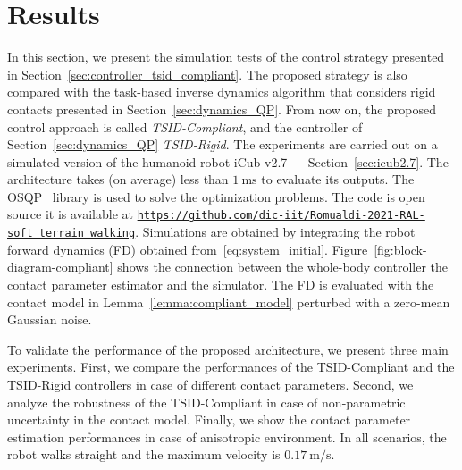 
\section{Results \label{sec:results_compliant}}









In this section, we present the simulation tests of the control strategy presented in Section~\ref{sec:controller_tsid_compliant}.
The proposed strategy is also compared with the task-based inverse dynamics algorithm that considers rigid contacts presented in Section~\ref{sec:dynamics_QP}. From now on, the proposed control approach is called \emph{TSID-Compliant}, and the controller of Section~\ref{sec:dynamics_QP} \emph{TSID-Rigid}.
The experiments are carried out on a simulated version of the humanoid robot iCub v2.7~\citep{Metta2010} -- Section~\ref{sec:icub2.7}. The architecture takes (on average) less than $\SI{1}{\milli \second}$ to evaluate its outputs. The OSQP~\citep{Stellato2018} library is used to solve the optimization problems. The code is open source it is available at \href{https://github.com/ami-iit/Romualdi-2021-RAL-soft\_terrain\_walking}{\texttt{https://github.com/dic-iit/Romualdi-2021-RAL-soft\_terrain\_walking}}.
Simulations are obtained by integrating the robot forward dynamics (FD) obtained from~\eqref{eq:system_initial}. Figure~\ref{fig:block-diagram-compliant} shows the connection between the whole-body controller the contact parameter estimator and the simulator. The FD is evaluated with the contact model in Lemma~\ref{lemma:compliant_model} perturbed with a zero-mean Gaussian noise.
\par
To validate the performance of the proposed architecture, we present three main experiments.
First, we compare the performances of the TSID-Compliant and the TSID-Rigid controllers in case of different contact parameters. Second, we analyze the robustness of the TSID-Compliant in case of non-parametric uncertainty in the contact model. Finally, we show the contact parameter estimation performances in case of anisotropic environment. In all scenarios, the robot walks straight and the maximum velocity is $\SI{0.17}{\meter \per \second}$.
